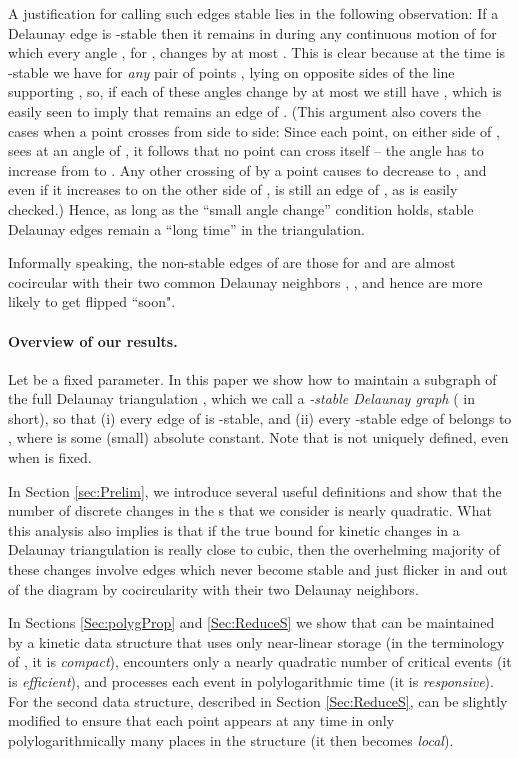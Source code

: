 \documentclass[letter,11pt]{article}
\begin{document}
A justification for calling such edges stable lies in the following
observation: If a Delaunay edge  is -stable then it 
remains in  during any continuous motion of  for which
every angle , for , changes
by at most . This is clear because at the time  is
-stable we have
 for \textit{any} pair of points
,  lying on opposite sides of the line  supporting , so,
if each of these angles change by at most  we still have
, which is easily seen to imply
that  remains an edge of . (This argument also covers the cases when a point  crosses  from side to side: Since
each point, on either side of , sees  at an angle of , it follows that no point can cross
 itself -- the angle has to increase from  to . Any other crossing of  by a point  causes  to
decrease to , and even if it increases to  on the other side of ,  is still an edge of , as is easily checked.)
Hence, as long as the ``small angle change'' condition 
holds, stable Delaunay edges remain a ``long time'' in the
triangulation.

Informally speaking, the non-stable edges  of  are those for  and 
are almost cocircular with their two common Delaunay neighbors
, , and hence are more likely to get flipped ``soon". 

\paragraph{Overview of our results.}
Let  be a fixed parameter.
In this paper we show how to maintain a subgraph of the full Delaunay 
triangulation , which we call a {\em -stable Delaunay graph} ( in short), so that (i) every edge of  is -stable, 
and (ii) every -stable edge of  belongs to , where  is some (small) absolute constant.
Note that  is not uniquely defined, even when  is fixed.

In Section \ref{sec:Prelim}, we introduce several useful definitions and show that the number of discrete changes in the s
that we consider
is nearly quadratic. 
What this analysis also implies is that if the true bound for
kinetic changes in a Delaunay triangulation is really close to cubic, then
the overhelming majority of these changes involve edges which never become stable and just flicker in and out of the diagram by cocircularity with their two Delaunay neighbors.

In Sections \ref{Sec:polygProp} and \ref{Sec:ReduceS} we show that  can be
maintained by a kinetic data structure that uses only near-linear
storage (in the terminology of \cite{bgh-dsmd-99}, it is {\em compact}), 
encounters only a nearly quadratic number of critical events 
(it is {\em efficient}), and processes each event in polylogarithmic 
time (it is {\em responsive}). For the second data structure, described in Section \ref{Sec:ReduceS}, can be slightly modified to ensure that each point appears at any time 
in only polylogarithmically many places in the structure (it then becomes 
{\em local}). 
\end{document}
